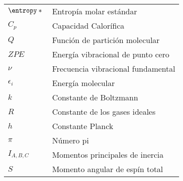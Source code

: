 \begin{tabular}{ll}

$\entropy*{}$ & Entropía molar estándar \\

$C_{p}$ & Capacidad Calorífica \\

$Q$ & Función de partición molecular \\

$ZPE$ & Energía vibracional de punto cero \\

$\nu$ & Frecuencia vibracional fundamental \\

$\epsilon _{i}$ & Energía molecular \\

$k$ & Constante de Boltzmann \\
 
$R$  & Constante de los gases ideales\\

$h$  & Constante Planck\\

$\pi$ & Número pi\\

$I_{A,B,C}$ & Momentos principales de inercia\\

$S$ & Momento angular de espín total\\

\end{tabular} 

